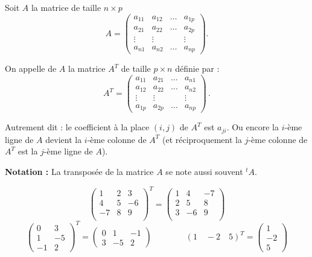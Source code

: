 \documentclass[class=report,crop=false]{standalone}
\begin{document}
Soit $A$ la matrice de taille $n\times p$
$$
A = \left(
\begin{array}{cccc}
a_{11} & a_{12} & \dots & a_{1p}\\
a_{21} & a_{22} & \dots & a_{2p}\\
\vdots & \vdots &&\vdots\\
a_{n1} & a_{n2} & \dots & a_{np}
\end{array}\right).
$$

\begin{definition}
On appelle  de $A$ la matrice $A^T$ de taille $p \times n$
définie par :
$$
A^T = \left(
\begin{array}{cccc}
a_{11} & a_{21} & \dots & a_{n1}\\
a_{12} & a_{22} & \dots & a_{n2}\\
\vdots & \vdots &&\vdots\\
a_{1p} & a_{2p} &\dots & a_{np}
\end{array}\right)\, .
$$
\end{definition}

Autrement dit : le coefficient à la place $(i,j)$ de $A^T$  est $a_{ji}$.
Ou encore la $i$-ème ligne de $A$ devient la $i$-ème colonne de $A^{T}$
(et réciproquement la $j$-ème colonne de $A^T$ est la $j$-ème ligne de $A$).

\bigskip

{\bf Notation :} La transposée de la matrice $A$ se note aussi souvent $^{t\!}A$.

\begin{exemple}

$$
\begin{pmatrix}
1&2&3\\
4&5&-6\\
-7&8&9\\
\end{pmatrix}^T
=
\begin{pmatrix}
1&4&-7\\
2&5&8\\
3&-6&9\\
\end{pmatrix}$$
$$\begin{pmatrix}
 0 & 3\\
 1 & -5\\
 -1 & 2
\end{pmatrix}^T=
\begin{pmatrix}
 0 & 1 & -1\\
 3 &-5 & 2
\end{pmatrix}
\qquad\qquad
(1\quad -2\quad 5)^T  =
\begin{pmatrix}
 1 \\
 -2\\
 5
\end{pmatrix}
$$
\end{exemple}
\end{document}
